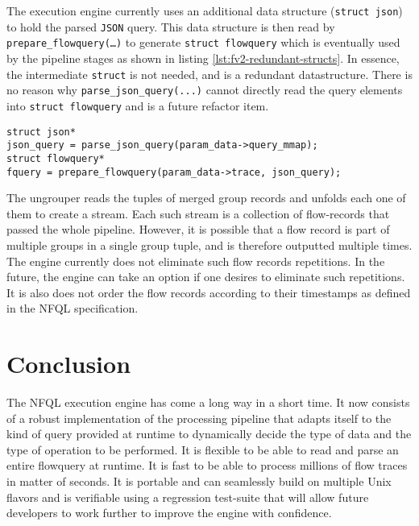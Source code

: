 The execution engine currently uses an additional data structure
(\texttt{struct json}) to hold the parsed \texttt{JSON} query. This data
structure is then read by \texttt{prepare\_flowquery(\ldots)} to generate
\texttt{struct flowquery} which is eventually used  by the pipeline stages as shown in listing
\ref{lst:fv2-redundant-structs}. In essence, the intermediate \texttt{struct}
is not needed, and is a redundant datastructure. There is no reason why
\texttt{parse\_json\_query(...)} cannot directly read the query elements into
\texttt{struct flowquery} and is a future refactor item.

\begin{lstlisting}
struct json*
json_query = parse_json_query(param_data->query_mmap);
struct flowquery*
fquery = prepare_flowquery(param_data->trace, json_query);
\end{lstlisting}

The ungrouper reads the tuples of merged group records and unfolds each one of
them to create a stream. Each such stream is a collection of flow-records that
passed the whole pipeline. However, it is possible that a flow record is part
of multiple groups in a single group tuple, and is  therefore outputted multiple times. The engine
currently does not eliminate such flow records repetitions. In the future, the
engine can take an option if one desires to eliminate such repetitions. It is
also does not order the flow records according to their timestamps as defined
in the \ac{NFQL} specification.


\section{Conclusion}\label{sec:conclusion}

The \ac{NFQL} execution engine has come a long way in a short time. It now
consists of a robust implementation of the processing pipeline that adapts
itself to the kind of query provided at runtime to dynamically decide the type
of data and the type of operation to be performed. It is flexible to be able
to read and parse an entire flowquery at runtime. It is fast to be able to
process millions of flow traces in matter of seconds. It is portable and can
seamlessly build on multiple Unix flavors and is verifiable using a regression
test-suite that will allow future developers to work further to improve the
engine with confidence.
